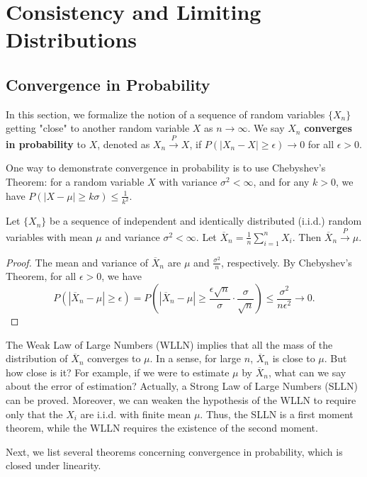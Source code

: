 \section{Consistency and Limiting Distributions}

\subsection{Convergence in Probability}

In this section, we formalize the notion of a sequence of random variables $\{X_n\}$ getting "close" to another random variable $X$ as $n \to \infty$. We say $X_n$ \textbf{converges in probability} to $X$, denoted as $X_n \overset{P}{\to} X$, if $P(|X_n - X| \geq \epsilon) \to 0$ for all $\epsilon > 0$.

One way to demonstrate convergence in probability is to use Chebyshev's Theorem: for a random variable $X$ with variance $\sigma^2 < \infty$, and for any $k > 0$, we have $P(|X - \mu| \geq k\sigma) \leq \frac{1}{k^2}$.

Let $\{X_n\}$ be a sequence of independent and identically distributed (i.i.d.) random variables with mean $\mu$ and variance $\sigma^2 < \infty$. Let $\overline{X}_n = \frac{1}{n} \sum_{i=1}^n X_i$. Then $\overline{X}_n \overset{P}{\to} \mu$.

\begin{proof}
The mean and variance of $\overline{X}_n$ are $\mu$ and $\frac{\sigma^2}{n}$, respectively. By Chebyshev's Theorem, for all $\epsilon > 0$, we have
\[
P(|\overline{X}_n - \mu| \geq \epsilon) = P\left(|\overline{X}_n - \mu| \geq \frac{\epsilon \sqrt{n}}{\sigma} \cdot \frac{\sigma}{\sqrt{n}}\right) \leq \frac{\sigma^2}{n\epsilon^2} \to 0.
\]
\end{proof}

The Weak Law of Large Numbers (WLLN) implies that all the mass of the distribution of $\overline{X}_n$ converges to $\mu$. In a sense, for large $n$, $\overline{X}_n$ is close to $\mu$. But how close is it? For example, if we were to estimate $\mu$ by $\overline{X}_n$, what can we say about the error of estimation? Actually, a Strong Law of Large Numbers (SLLN) can be proved. Moreover, we can weaken the hypothesis of the WLLN to require only that the $X_i$ are i.i.d. with finite mean $\mu$. Thus, the SLLN is a first moment theorem, while the WLLN requires the existence of the second moment.

Next, we list several theorems concerning convergence in probability, which is closed under linearity.

